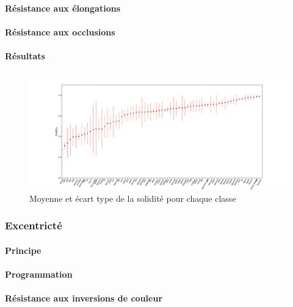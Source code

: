 \documentclass{article}
\begin{document}
	\paragraph{Résistance aux élongations}
	
	\paragraph{Résistance aux occlusions}
	  
	\paragraph{Résultats}
	
	  \begin{figure}[!h]
	    \begin{bigcenter}
	      \includegraphics[scale=0.38]{Graphes/solidite.png}
	    \end{bigcenter}
	    \caption{Moyenne et écart type de la solidité pour chaque classe}
	    \label{solidité}
	  \end{figure}

      \subsubsection{Excentricté}
      
	\paragraph{Principe}
      
	\paragraph{Programmation}
	
	\paragraph{Résistance aux inversions de couleur}
	
\end{document}
